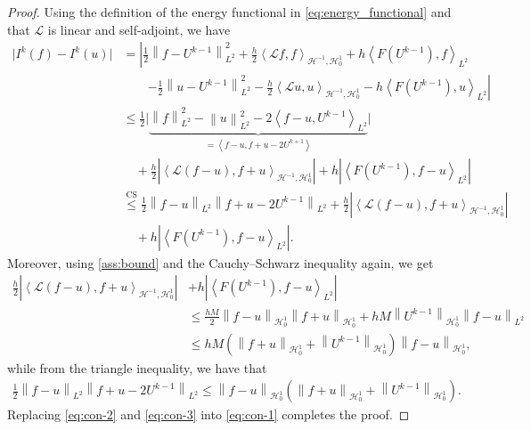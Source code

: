 \documentclass[11pt,a4paper,reqno]{amsart}
\numberwithin{equation}{section}
\theoremstyle{plain}
\theoremstyle{definition}
\newcommand{\ip}[1]{\left\langle#1\right\rangle}
\newcommand{\cL}{\mathcal{L}}
\newcommand{\cH}{\mathcal{H}}
\newcommand{\R}{\mathbb{R}}
\newcommand{\norm}[1]{\left\|#1 \right\|} %
\newcommand{\abs}[1]{\left|#1\right|} %
\begin{document}
\begin{proof}
Using the definition of the energy functional in \eqref{eq:energy_functional} and that $\cL$ is linear and self-adjoint, we have
\begin{align}\label{eq:con-1}
\big| I^k \left( f \right) - I^k (u) \big| 
    &= \left| \frac{1}{2} \norm{f - U^{k - 1}}^2_{L^2} +   \frac{h}{2}\ip{\cL f,f}_{\cH^{-1},\cH_0^1} + h\ip{F \left( U^{k - 1} \right),f}_{L^2}  \right. \nonumber\\ 
    &\qquad \left. - \frac{1}{2} \norm{u - U^{k - 1}}^2_{L^2} - \frac{h}{2}\ip{\cL u,u}_{\cH^{-1},\cH_0^1} -h\ip{F \left( U^{k - 1} \right),u}_{L^2} \right| \nonumber\\
    &\leq \frac{1}{2} \Big|\underbrace{\norm{f}^2_{L^2} - \norm{u}^2_{L^2}-2\ip{f-u,U^{k-1}}_{L^2}}_{= \ip{f-u,f+u-2U^{k+1}}}\Big| \nonumber\\
    &\quad + \frac{h}{2} \abs{ \ip{\cL (f-u), f+u}_{\cH^{-1},\cH_0^1} }
        + h \abs{\ip{F \left( U^{k - 1} \right),f - u}_{L^2}} \nonumber\\
    &\stackrel{\text{CS}}{\le} \frac{1}{2} \norm{f - u}_{L^2} \norm{f + u - 2 U^{k-1}}_{L^2} + \frac{h}{2} \abs{\ip{\cL (f-u),f+u}_{\cH^{-1},\cH_0^1}}\nonumber\\ 
    &\quad  + h \abs{\ip{F \left( U^{k - 1} \right),f-u}_{L^2}} .
\end{align}
Moreover, using \cref{ass:bound} and the Cauchy--Schwarz inequality again, we get
\begin{align}\label{eq:con-2}
\frac{h}{2} \abs{\ip{\cL (f-u),f+u}_{\cH^{-1},\cH_0^1}} & + h \abs{\ip{F \left( U^{k - 1} \right),f-u}_{L^2}} \nonumber\\ 
& \le \frac{h M}{2}\norm{  f - u }_{\cH_0^1}\norm{ f + u }_{\cH_0^1} + hM\norm{ U^{k - 1}}_{\cH_0^1}\norm{f - u}_{L^2} \nonumber\\ 
& \le  hM \left( \norm{f + u}_{\cH_0^1} + \norm{U^{k - 1}}_{\cH_0^1} \right) \norm{f - u}_{\cH_0^1},
\end{align}
while from the triangle inequality, we have that
\begin{align}\label{eq:con-3}
 \frac{1}{2} \norm{f - u}_{L^2}\norm{f + u - 2U^{k - 1}}_{L^2} \le \norm{f - u}_{\cH_0^1} \left( \norm{f + u}_{\cH_0^1} + \norm{U^{k - 1}}_{\cH_0^1} \right) . 
\end{align}
Replacing \eqref{eq:con-2} and \eqref{eq:con-3} into \eqref{eq:con-1} completes the proof.
\end{proof}
\end{document}
